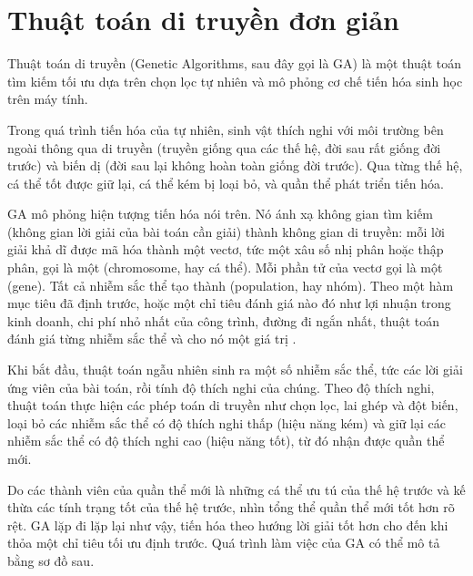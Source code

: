 \documentclass[11pt]{article}
\begin{document}
\section{Thuật toán di truyền đơn giản}

Thuật toán di truyền (Genetic Algorithms, sau đây gọi là GA) là một thuật
toán tìm kiếm tối ưu dựa trên chọn lọc tự nhiên và mô phỏng cơ chế tiến hóa
sinh học trên máy tính.

Trong quá trình tiến hóa của tự nhiên, sinh vật thích nghi với môi trường bên
ngoài thông qua di truyền (truyền giống qua các thế hệ, đời sau rất giống
đời trước) và biến dị (đời sau lại không hoàn toàn giống đời trước). Qua từng
thế hệ, cá thể tốt được giữ lại, cá thể kém bị loại bỏ, và quần thể phát
triển tiến hóa.

GA mô phỏng hiện tượng tiến hóa nói trên. Nó ánh xạ không gian tìm kiếm
(không gian lời giải của bài toán cần giải) thành không gian di truyền: mỗi
lời giải khả dĩ được mã hóa thành một vectơ, tức một xâu số nhị phân hoặc
thập phân, gọi là một  (chromosome, hay cá thể). Mỗi phần
tử của vectơ gọi là một  (gene). Tất cả nhiễm sắc thể tạo thành
 (population, hay nhóm). Theo một hàm mục tiêu đã định trước,
hoặc một chỉ tiêu đánh giá nào đó như lợi nhuận trong kinh doanh, chi phí nhỏ
nhất của công trình, đường đi ngắn nhất, thuật toán đánh giá từng nhiễm sắc
thể và cho nó một giá trị .

Khi bắt đầu, thuật toán ngẫu nhiên sinh ra một số nhiễm sắc thể, tức các lời
giải ứng viên của bài toán, rồi tính độ thích nghi của chúng. Theo độ thích
nghi, thuật toán thực hiện các phép toán di truyền như chọn lọc, lai ghép và
đột biến, loại bỏ các nhiễm sắc thể có độ thích nghi thấp (hiệu năng kém) và
giữ lại các nhiễm sắc thể có độ thích nghi cao (hiệu năng tốt), từ đó nhận
được quần thể mới.

Do các thành viên của quần thể mới là những cá thể ưu tú của thế hệ trước và
kế thừa các tính trạng tốt của thế hệ trước, nhìn tổng thể quần thể mới tốt
hơn rõ rệt. GA lặp đi lặp lại như vậy, tiến hóa theo hướng lời giải tốt hơn
cho đến khi thỏa một chỉ tiêu tối ưu định trước. Quá trình làm việc của GA có
thể mô tả bằng sơ đồ sau.
\end{document}

